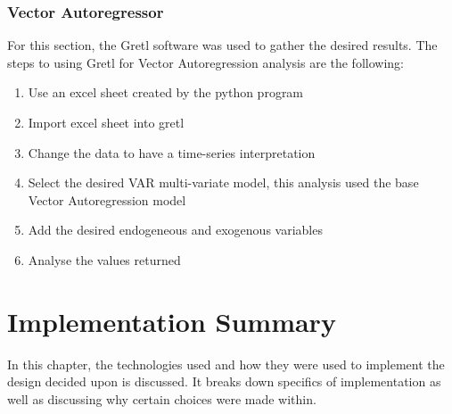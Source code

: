 \subsubsection{Vector Autoregressor}

For this section, the Gretl software was used to gather the desired results. The steps to using Gretl for Vector Autoregression analysis are the following:
\begin{enumerate}
    \item Use an excel sheet created by the python program
    \item Import excel sheet into gretl
    \item Change the data to have a time-series interpretation
    \item Select the desired VAR multi-variate model, this analysis used the base Vector Autoregression model
    \item Add the desired endogeneous and exogenous variables
    \item Analyse the values returned
\end{enumerate}

\section{Implementation Summary}

In this chapter, the technologies used and how they were used to implement the design decided upon is discussed. It breaks down specifics of implementation as well as discussing why certain choices were made within.
